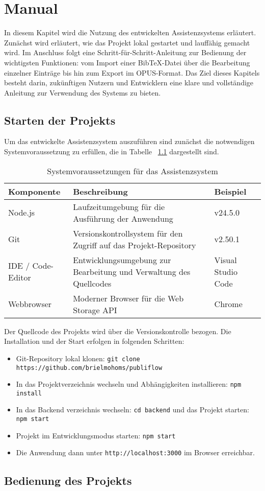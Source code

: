 \chapter{Manual}
In diesem Kapitel wird die Nutzung des entwickelten Assistenzsystems erläutert. 
Zunächst wird erläutert, wie das Projekt lokal gestartet und lauffähig gemacht 
wird. Im Anschluss folgt eine Schritt-für-Schritt-Anleitung zur Bedienung der 
wichtigsten Funktionen: vom Import einer BibTeX-Datei über die Bearbeitung 
einzelner Einträge bis hin zum Export im OPUS-Format. Das Ziel dieses Kapitels 
besteht darin, zukünftigen Nutzern und Entwicklern eine klare und vollständige 
Anleitung zur Verwendung des Systems zu bieten.


\section{Starten der Projekts}
Um das entwickelte Assistenzsystem auszuführen sind zunächst
die notwendigen Systemvoraussetzung zu erfüllen, die in Tabelle
~\ref{tab:systemvoraussetzungen} dargestellt sind. 

\begin{table}[h]
\centering
\begin{tabular}{|l|p{8cm}|l|}
\hline
\textbf{Komponente} & \textbf{Beschreibung} & \textbf{Beispiel} \\
\hline
Node.js & Laufzeitumgebung für die Ausführung der Anwendung & v24.5.0 \\
\hline
Git & Versionskontrollsystem für den Zugriff auf das Projekt-Repository & v2.50.1 \\
\hline
IDE / Code-Editor & Entwicklungsumgebung zur Bearbeitung und Verwaltung des Quellcodes & Visual Studio Code \\
\hline
Webbrowser & Moderner Browser für die Web Storage API & Chrome \\
\hline
\end{tabular}
\caption{Systemvoraussetzungen für das Assistenzsystem}
\label{tab:systemvoraussetzungen}
\end{table}

\noindent Der Quellcode des Projekts wird über die Versionskontrolle bezogen. Die Installation und der Start erfolgen in folgenden Schritten:

\begin{itemize}
    \item Git-Repository lokal klonen: \texttt{git clone https://github.com/brielmohoms/publiflow}

    \item In das Projektverzeichnis wechseln und Abhängigkeiten installieren: \texttt{npm install}
    
    \item In das Backend verzeichnis wechseln: \texttt{cd backend} und das Projekt starten: \texttt{npm start}

    \item Projekt im Entwicklungsmodus starten: \texttt{npm start}

    \item Die Anwendung dann unter \texttt{http://localhost:3000} im Browser erreichbar.
\end{itemize}


\section{Bedienung des Projekts}